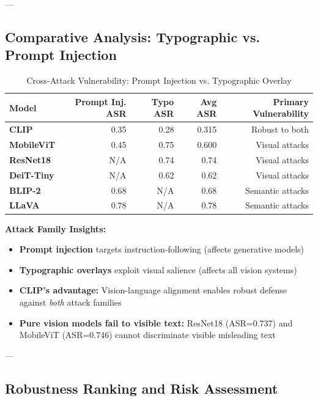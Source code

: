 \documentclass[11pt]{article}
\begin{document}
---

\subsection{Comparative Analysis: Typographic vs. Prompt Injection}

\begin{table}[H]
\centering
\small
\caption{Cross-Attack Vulnerability: Prompt Injection vs. Typographic Overlay}
\label{tab:cross_attack}
\begin{tabular}{|l|r|r|r|r|}
\hline
\textbf{Model} & \textbf{Prompt Inj. ASR} & \textbf{Typo ASR} & \textbf{Avg ASR} & \textbf{Primary Vulnerability} \\
\hline
\textbf{CLIP} & 0.35 & 0.28 & 0.315 & Robust to both \\
\hline
\textbf{MobileViT} & 0.45 & 0.75 & 0.600 & Visual attacks \\
\hline
\textbf{ResNet18} & N/A & 0.74 & 0.74 & Visual attacks \\
\hline
\textbf{DeiT-Tiny} & N/A & 0.62 & 0.62 & Visual attacks \\
\hline
\textbf{BLIP-2} & 0.68 & N/A & 0.68 & Semantic attacks \\
\hline
\textbf{LLaVA} & 0.78 & N/A & 0.78 & Semantic attacks \\
\hline
\end{tabular}
\end{table}

\textbf{Attack Family Insights:}

\begin{itemize}[leftmargin=2em]
    \item \textbf{Prompt injection} targets instruction-following (affects generative models)
    \item \textbf{Typographic overlays} exploit visual salience (affects all vision systems)
    \item \textbf{CLIP's advantage:} Vision-language alignment enables robust defense against \emph{both} attack families
    \item \textbf{Pure vision models fail to visible text:} ResNet18 (ASR=0.737) and MobileViT (ASR=0.746) cannot discriminate visible misleading text
\end{itemize}

---

\subsection{Robustness Ranking and Risk Assessment}
\end{document}
